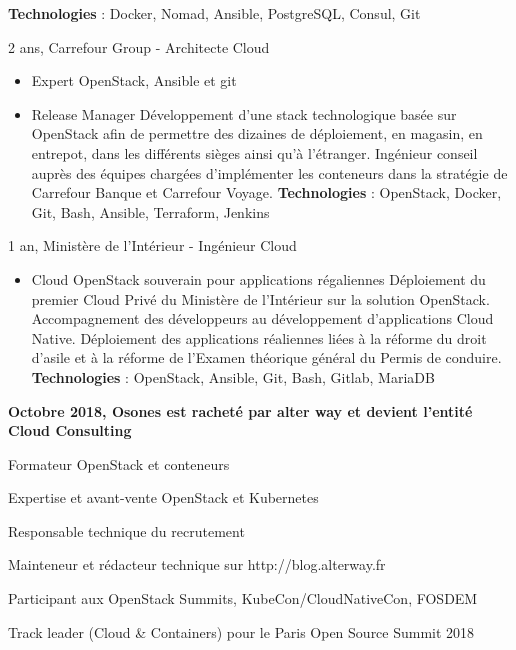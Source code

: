 \begin{cventries}
{\begin{cvitems}
\begin{itemize}
{              \textbf{Technologies} : Docker, Nomad, Ansible, PostgreSQL,
              Consul, Git
            }
        \end{itemize}
      \item {2 ans, Carrefour Group - Architecte Cloud}
        \begin{itemize}
          \item {Expert OpenStack, Ansible et git}
          \item {Release Manager}
            \newline{}
            {
              Développement d'une stack technologique basée sur OpenStack afin
              de permettre des dizaines de déploiement, en magasin, en
              entrepot, dans les différents sièges ainsi qu'à l'étranger.
              Ingénieur conseil auprès des équipes chargées d'implémenter les
              conteneurs dans la stratégie de Carrefour Banque et Carrefour
              Voyage. \newline{}
              \textbf{Technologies} : OpenStack, Docker, Git, Bash, Ansible,
              Terraform, Jenkins
            }
        \end{itemize}
      \item {1 an, Ministère de l'Intérieur - Ingénieur Cloud}
        \begin{itemize}
            \item {Cloud OpenStack souverain pour applications régaliennes}
              \newline{}
              {
                Déploiement du premier Cloud Privé du Ministère de l'Intérieur
                sur la solution OpenStack. Accompagnement des développeurs au
                développement d'applications Cloud Native. Déploiement des
                applications réaliennes liées à la réforme du droit d'asile et
                à la réforme de l'Examen théorique général du Permis de
                conduire.\newline{}
                \textbf{Technologies} : OpenStack, Ansible, Git, Bash, Gitlab,
                MariaDB
              }
        \end{itemize}
      \item {\textbf{Octobre 2018, Osones est racheté par alter way et devient
        l'entité Cloud Consulting}}
        \item {Formateur OpenStack et conteneurs}
        \item {Expertise et avant-vente OpenStack et Kubernetes}
        \item {Responsable technique du recrutement}
        \item {Mainteneur et rédacteur technique sur http://blog.alterway.fr}
        \item {Participant aux OpenStack Summits, KubeCon/CloudNativeCon, FOSDEM}
        \item {Track leader (Cloud \& Containers) pour le Paris Open Source Summit
        2018}
      \end{cvitems}
    }


\end{cventries}
